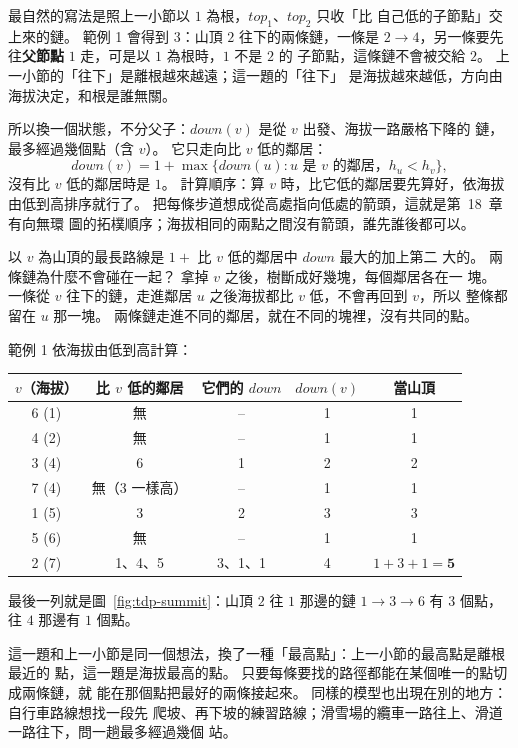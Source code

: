 最自然的寫法是照上一小節以 $1$ 為根，$\mathit{top}_1$、$\mathit{top}_2$ 只收「比
自己低的子節點」交上來的鏈。 範例 1 會得到 $3$：山頂 $2$ 往下的兩條鏈，一條是
$2 \to 4$，另一條要先往\textbf{父節點} $1$ 走，可是以 $1$ 為根時，$1$ 不是 $2$ 的
子節點，這條鏈不會被交給 $2$。 上一小節的「往下」是離根越來越遠；這一題的「往下」
是海拔越來越低，方向由海拔決定，和根是誰無關。

所以換一個狀態，不分父子：$\mathit{down}(v)$ 是從 $v$ 出發、海拔一路嚴格下降的
鏈，最多經過幾個點（含 $v$）。 它只走向比 $v$ 低的鄰居：
\[
\mathit{down}(v) = 1 + \max\{\mathit{down}(u) : u \text{ 是 } v \text{ 的鄰居，} h_u < h_v\},
\]
沒有比 $v$ 低的鄰居時是 $1$。 計算順序：算 $v$ 時，比它低的鄰居要先算好，依海拔
由低到高排序就行了。 把每條步道想成從高處指向低處的箭頭，這就是第~18~章有向無環
圖的拓樸順序；海拔相同的兩點之間沒有箭頭，誰先誰後都可以。

以 $v$ 為山頂的最長路線是 $1 + $ 比 $v$ 低的鄰居中 $\mathit{down}$ 最大的加上第二
大的。 兩條鏈為什麼不會碰在一起？ 拿掉 $v$ 之後，樹斷成好幾塊，每個鄰居各在一
塊。 一條從 $v$ 往下的鏈，走進鄰居 $u$ 之後海拔都比 $v$ 低，不會再回到 $v$，所以
整條都留在 $u$ 那一塊。 兩條鏈走進不同的鄰居，就在不同的塊裡，沒有共同的點。

範例 1 依海拔由低到高計算：

\begin{center}
\begin{tabular}{ccccc}
\toprule
$v$（海拔） & 比 $v$ 低的鄰居 & 它們的 $\mathit{down}$ & $\mathit{down}(v)$ & 當山頂 \\
\midrule
6 (1) & 無 & -- & 1 & 1 \\
4 (2) & 無 & -- & 1 & 1 \\
3 (4) & 6 & 1 & 2 & 2 \\
7 (4) & 無（3 一樣高） & -- & 1 & 1 \\
1 (5) & 3 & 2 & 3 & 3 \\
5 (6) & 無 & -- & 1 & 1 \\
2 (7) & 1、4、5 & 3、1、1 & 4 & $1 + 3 + 1 = \mathbf{5}$ \\
\bottomrule
\end{tabular}
\end{center}

最後一列就是圖~\ref{fig:tdp-summit}：山頂 $2$ 往 $1$ 那邊的鏈 $1 \to 3 \to 6$ 有
$3$ 個點，往 $4$ 那邊有 $1$ 個點。

這一題和上一小節是同一個想法，換了一種「最高點」：上一小節的最高點是離根最近的
點，這一題是海拔最高的點。 只要每條要找的路徑都能在某個唯一的點切成兩條鏈，就
能在那個點把最好的兩條接起來。 同樣的模型也出現在別的地方：自行車路線想找一段先
爬坡、再下坡的練習路線；滑雪場的纜車一路往上、滑道一路往下，問一趟最多經過幾個
站。

